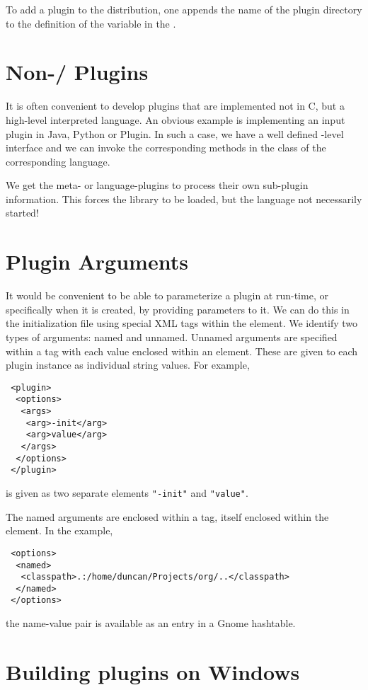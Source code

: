 \documentclass{article}
\def\file#1{\href{#1}{\Escape{#1}}}
\begin{document}
To add a plugin to the distribution, one appends the name of the
plugin directory to the definition of the variable
 in the \file{Install/GNUmakefile.admin}.


\section{Non-\C/\Cplus{} Plugins}

It is often convenient to develop plugins that are implemented not in
C, but a high-level interpreted language.  An obvious example is
implementing an input plugin in Java, Python or Plugin.  In such a
case, we have a well defined \C-level interface and we can invoke the
corresponding methods in the class of the corresponding language.

We get the meta- or language-plugins to process their own sub-plugin
information. This forces the library to be loaded, but the 
language not necessarily started!

\section{Plugin Arguments}
It would be convenient to be able to parameterize a plugin at
run-time, or specifically when it is created, by providing parameters
to it.  We can do this in the initialization file using special XML
tags within the  element.  We identify two types of
arguments: named and unnamed.  Unnamed arguments are specified within
a  tag with each value enclosed within an 
element.  These are given to each plugin instance as
individual string values.
For example,
\begin{verbatim}
 <plugin>
  <options>
   <args>
    <arg>-init</arg>
    <arg>value</arg>
   </args>
  </options>
 </plugin>
\end{verbatim}
is given as two separate elements
\texttt{"-init"} and \texttt{"value"}.

The named arguments are enclosed within a  tag, itself
enclosed within the  element.
In the example,
\begin{verbatim}
 <options>
  <named>
   <classpath>.:/home/duncan/Projects/org/..</classpath>
  </named>
 </options>
\end{verbatim}
the name-value pair is available as an entry in
a Gnome hashtable.



\section{Building plugins on Windows}



\begin{comment}
\section{Issues}
Configuration

Debugging dynamically loaded code.

The plugin mechanism requires XML.
\end{comment}
\end{document}
